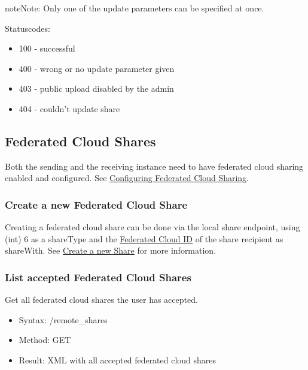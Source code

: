 \documentclass[letterpaper,10pt,english]{sphinxmanual}
\begin{document}
\begin{notice}{note}{Note:}
Only one of the update parameters can be specified at once.
\end{notice}

Statuscodes:
\begin{itemize}
\item {} 
100 - successful

\item {} 
400 - wrong or no update parameter given

\item {} 
403 - public upload disabled by the admin

\item {} 
404 - couldn't update share

\end{itemize}


\subsection{Federated Cloud Shares}
\label{core/ocs-share-api:federated-cloud-shares}
Both the sending and the receiving instance need to have federated cloud sharing
enabled and configured. See \href{https://doc.owncloud.org/server/9.0/admin\_manual/configuration\_files/federated\_cloud\_sharing\_configuration.html}{Configuring Federated Cloud Sharing}.


\subsubsection{Create a new Federated Cloud Share}
\label{core/ocs-share-api:create-a-new-federated-cloud-share}
Creating a federated cloud share can be done via the local share endpoint, using
(int) 6 as a shareType and the \href{https://owncloud.org/federation/}{Federated Cloud ID}
of the share recipient as shareWith. See {\hyperref[core/ocs-share-api:create-a-new-share]{Create a new Share}} for more information.


\subsubsection{List accepted Federated Cloud Shares}
\label{core/ocs-share-api:list-accepted-federated-cloud-shares}
Get all federated cloud shares the user has accepted.
\begin{itemize}
\item {} 
Syntax: /remote\_shares

\item {} 
Method: GET

\item {} 
Result: XML with all accepted federated cloud shares

\end{itemize}
\end{document}
